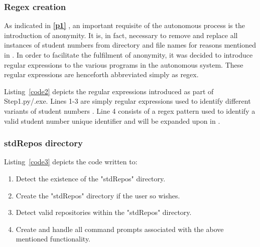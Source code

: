 \subsubsection{Regex creation}
\label{regex1}
As indicated in \textbf{\ref{p1} }, an important requisite of the autonomous process is the introduction of anonymity. It is, in fact, necessary to remove and replace all instances of student numbers from directory and file names for reasons mentioned in \textbf{}. In order to facilitate the fulfilment of anonymity, it was decided to introduce regular expressions to the various programs in the autonomous system. These regular expressions are henceforth abbreviated simply as regex. 



Listing~\ref{code2} depicts the regular expressions introduced as part of Step1.py/.exe. Lines 1-3 are simply regular expressions used to identify different variants of student numbers \cite{Sweigart2015}\cite{regex}. Line 4 consists of a regex pattern used to identify a valid student number unique identifier and will be expanded upon in \textbf{}.
\subsubsection{stdRepos directory}
\label{stdRepos}


Listing~\ref{code3} depicts the code written to:
\\
\begin{enumerate}
\item Detect the existence of the "stdRepos" directory.
\item Create the "stdRepos" directory if the user so wishes.
\item Detect valid repositories within the "stdRepos" directory.
\item Create and handle all command prompts associated with the above mentioned functionality.
\end{enumerate}

